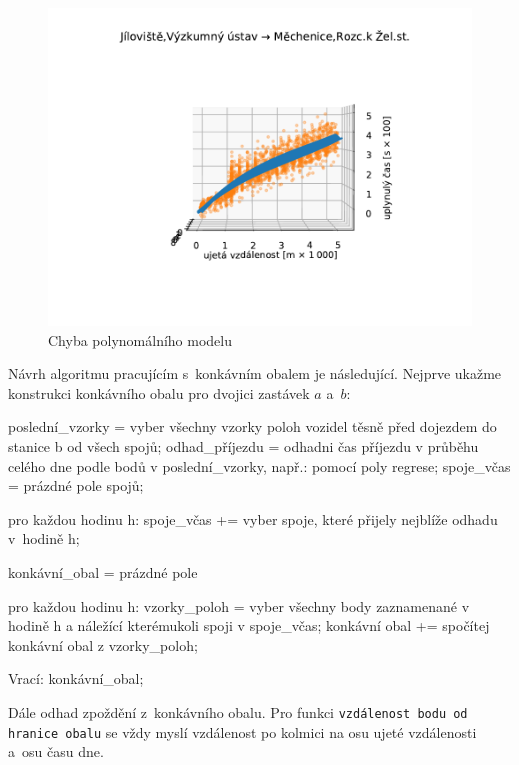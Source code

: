 \begin{figure}
\centering
  \includegraphics[width=\linewidth]{../img/8_9}
  \caption{Chyba polynomálního modelu}
  \label{fig:good_to_concave_hull}
\end{figure}


\bigbreak

Návrh algoritmu pracujícím s~konkávním obalem je následující. Nejprve ukaž\-me konstrukci konkávního obalu pro dvojici zastávek $a$ a~$b$:


\begin{code}[frame=none]
poslední_vzorky = vyber všechny vzorky poloh vozidel
  těsně před dojezdem do stanice b od všech spojů;
odhad_příjezdu = odhadni čas příjezdu v průběhu celého
  dne podle bodů v poslední_vzorky, např.: pomocí poly regrese;
spoje_včas = prázdné pole spojů;


pro každou hodinu h:
  spoje_včas += vyber spoje, které přijely nejblíže
    odhadu v~hodině h;


konkávní_obal = prázdné pole


pro každou hodinu h:
  vzorky_poloh = vyber všechny body zaznamenané
    v hodině h a náležící kterémukoli spoji v spoje_včas;
  konkávní obal += spočítej konkávní obal z vzorky_poloh;


Vrací: konkávní_obal;
\end{code}


Dále odhad zpoždění z~konkávního obalu. Pro funkci \texttt{vzdálenost bodu od hranice obalu} se vždy myslí vzdálenost po kolmici na osu ujeté vzdálenosti a~osu času dne.


